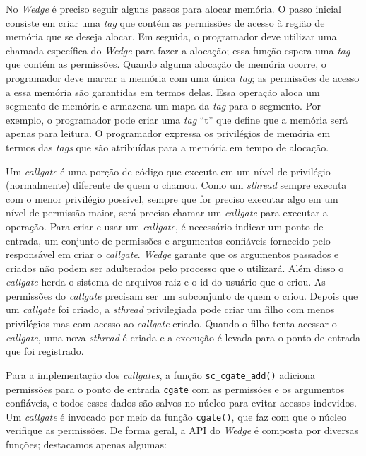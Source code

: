 No \emph{Wedge} é preciso seguir alguns passos para alocar memória. O passo
inicial consiste em criar uma \emph{tag} que contém as permissões de acesso à
região de memória que se deseja alocar. Em seguida, o programador deve utilizar
uma chamada específica do \emph{Wedge} para fazer a alocação; essa função
espera uma \emph{tag} que contém as permissões. Quando alguma alocação de
memória ocorre, o programador deve marcar a memória com uma única \emph{tag};
as permissões de acesso a essa memória são garantidas em termos delas. Essa
operação aloca um segmento de memória e armazena um mapa da \emph{tag} para o
segmento. Por exemplo, o programador pode criar uma \emph{tag} ``t'' que define
que a memória será apenas para leitura. O programador expressa os privilégios
de memória em termos das \emph{tags} que são atribuídas para a memória em tempo
de alocação.

Um \emph{callgate} é uma porção de código que executa em um nível de privilégio
(normalmente) diferente de quem o chamou. Como um \emph{sthread} sempre executa
com o menor privilégio possível, sempre que for preciso executar algo em um
nível de permissão maior, será preciso chamar um \emph{callgate} para executar
a operação. Para criar e usar um \emph{callgate}, é necessário indicar um ponto
de entrada, um conjunto de permissões e argumentos confiáveis fornecido pelo
responsável em criar o \emph{callgate}. \emph{Wedge} garante que os
argumentos passados e criados não podem ser adulterados pelo processo que o
utilizará. Além disso o \emph{callgate} herda o sistema de arquivos raiz e o id
do usuário que o criou. As permissões do \emph{callgate} precisam ser um
subconjunto de quem o criou. Depois que um \emph{callgate} foi criado, a
\emph{sthread} privilegiada pode criar um filho com menos privilégios mas com
acesso ao \emph{callgate} criado. Quando o filho tenta acessar o
\emph{callgate}, uma nova \emph{sthread} é criada e a execução é levada para o ponto
de entrada que foi registrado.

Para a implementação dos \emph{callgates}, a função \texttt{sc\_cgate\_add()}
adiciona permissões para o ponto de entrada \texttt{cgate} com as permissões e
os argumentos confiáveis, e todos esses dados são salvos no núcleo para evitar
acessos indevidos. Um \emph{callgate} é invocado por meio da função
\texttt{cgate()}, que faz com que o núcleo verifique as permissões. De forma
geral, a API do \emph{Wedge} é composta por diversas funções; destacamos apenas
algumas:

